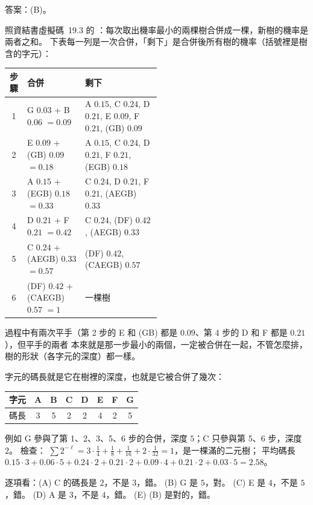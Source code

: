 \begin{pastsoln}
答案：(B)。

照資結書虛擬碼~19.3 的 ：每次取出機率最小的兩棵樹合併成一棵，新樹的機率是兩者之和。
下表每一列是一次合併，「剩下」是合併後所有樹的機率（括號裡是樹含的字元）：
\begin{center}
\small
\begin{tabular}{clp{0.5\linewidth}}
\toprule
步驟 & 合併 & 剩下 \\
\midrule
1 & G $0.03$ + B $0.06$ $= 0.09$ & A $0.15$, C $0.24$, D $0.21$, E $0.09$, F $0.21$, (GB) $0.09$ \\
2 & E $0.09$ + (GB) $0.09$ $= 0.18$ & A $0.15$, C $0.24$, D $0.21$, F $0.21$, (EGB) $0.18$ \\
3 & A $0.15$ + (EGB) $0.18$ $= 0.33$ & C $0.24$, D $0.21$, F $0.21$, (AEGB) $0.33$ \\
4 & D $0.21$ + F $0.21$ $= 0.42$ & C $0.24$, (DF) $0.42$, (AEGB) $0.33$ \\
5 & C $0.24$ + (AEGB) $0.33$ $= 0.57$ & (DF) $0.42$, (CAEGB) $0.57$ \\
6 & (DF) $0.42$ + (CAEGB) $0.57$ $= 1$ & 一棵樹 \\
\bottomrule
\end{tabular}
\end{center}
過程中有兩次平手（第 2 步的 E 和 (GB) 都是 $0.09$、第 4 步的 D 和 F 都是 $0.21$），但平手的兩者
本來就是那一步最小的兩個，一定被合併在一起，不管怎麼排，樹的形狀（各字元的深度）都一樣。

字元的碼長就是它在樹裡的深度，也就是它被合併了幾次：
\begin{center}
\begin{tabular}{lccccccc}
\toprule
字元 & A & B & C & D & E & F & G \\
\midrule
碼長 & 3 & 5 & 2 & 2 & 4 & 2 & 5 \\
\bottomrule
\end{tabular}
\end{center}
例如 G 參與了第 1、2、3、5、6 步的合併，深度 $5$；C 只參與第 5、6 步，深度 $2$。 檢查：
$\sum 2^{-\ell} = 3 \cdot \frac14 + \frac18 + \frac1{16} + 2 \cdot \frac1{32} = 1$，是一棵滿的二元樹；
平均碼長 $0.15 \cdot 3 + 0.06 \cdot 5 + 0.24 \cdot 2 + 0.21 \cdot 2 + 0.09 \cdot 4 + 0.21 \cdot 2 +
0.03 \cdot 5 = 2.58$。

逐項看：(A) C 的碼長是 $2$，不是 $3$，錯。 (B) G 是 $5$，對。 (C) E 是 $4$，不是 $5$，錯。
(D) A 是 $3$，不是 $4$，錯。 (E) (B) 是對的，錯。
\end{pastsoln}
